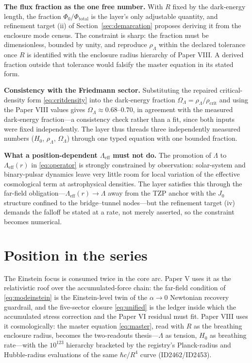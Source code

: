 \documentclass[11pt]{article}
\theoremstyle{remark}
\begin{document}
\textbf{The flux fraction as the one free number.} With $R$ fixed by the dark-energy length, the fraction $\Phi_0/\Phi_{\mathrm{total}}$ is the layer's only adjustable quantity, and refinement target (ii) of Section~\ref{sec:demarcation} proposes deriving it from the enclosure mode census. The constraint is sharp: the fraction must be dimensionless, bounded by unity, and reproduce $\rho_\Lambda$ within the declared tolerance once $R$ is identified with the enclosure radius hierarchy of Paper VIII. A derived fraction outside that tolerance would falsify the master equation in its stated form.

\textbf{Consistency with the Friedmann sector.} Substituting the repaired critical-density form \eqref{eq:critdensity} into the dark-energy fraction $\Omega_\Lambda = \rho_\Lambda / \rho_{\mathrm{crit}}$ and using the Paper VIII values gives $\Omega_\Lambda \approx 0.68$--$0.70$, in agreement with the measured dark-energy fraction---a consistency check rather than a fit, since both inputs were fixed independently. The layer thus threads three independently measured numbers ($H_0$, $\rho_\Lambda$, $\Omega_\Lambda$) through one typed equation with one bounded fraction.

\textbf{What a position-dependent $\Lambda_{\mathrm{eff}}$ must not do.} The promotion of $\Lambda$ to $\Lambda_{\mathrm{eff}}(r)$ in \eqref{eq:operator} is strongly constrained by observation: solar-system and binary-pulsar dynamics leave very little room for local variation of the effective cosmological term at astrophysical densities. The layer satisfies this through the far-field obligation---$\Lambda_{\mathrm{eff}}(r) \to \Lambda$ away from the TZP anchor with the $J_0$ structure confined to the bridge--tunnel nodes---but the refinement target (iv) demands the falloff be stated at a rate, not merely asserted, so the constraint becomes numerical.

\section{Position in the series}
\label{sec:series}

The Einstein focus is consumed twice in the core arc. Paper V uses it as the relativistic roof over the accumulated-force chain: the far-field condition of \eqref{eq:modeinstein} is the Einstein-level twin of the $\alpha \to 0$ Newtonian recovery guardrail, and the five-sector closure \eqref{eq:unified} is the ledger inside which the accumulated stress correction and the Paper VI residual must fit. Paper VIII uses it cosmologically: the master equation \eqref{eq:master}, read with $R$ as the breathing enclosure radius, becomes the two-readouts thesis---$\Lambda$ as tension, $H_0$ as breathing rate---with the $10^{123}$ hierarchy bracketed by the registry's Planck-radius and Hubble-radius evaluations of the same $\hbar c/R^4$ curve (ID2462/ID2453).
\end{document}
